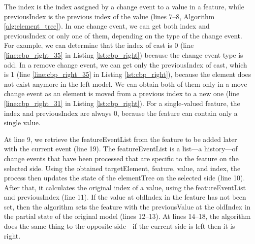 The \textsf{index} is the index assigned by a change event to a value in a feature, while \textsf{previousIndex} is the previous index of the value (lines 7–8, Algorithm \ref{alg:element_tree}). In one change event, we can get both \textsf{index} and \textsf{previousIndex} or only one of them, depending on the type of the change event. For example, we can determine that the \textsf{index} of \textsf{cast} is 0 (line \ref{line:cbp_right_35} in Listing \ref{lst:cbp_right}) because the change event type is \textsf{add}. In a \textsf{remove} change event, we can get only the \textsf{previousIndex} of \textsf{cast}, which is 1 (line \ref{line:cbp_right_35} in Listing \ref{lst:cbp_right}), because the element does not exist anymore in the left model. We can obtain both of them only in a \textsf{move} change event as an element is moved from a previous index to a new one (line \ref{line:cbp_right_31} in Listing \ref{lst:cbp_right}). For a single-valued feature, the \textsf{index} and \textsf{previousIndex} are always 0, because the feature can contain only a single value.

At line 9, we retrieve the \textsf{featureEventList} from the \textsf{feature} to be added later with the current \textsf{event} (line 19). The \textsf{featureEventList} is a list—a history—of change events that have been processed that are specific to the \textsf{feature} on the selected \textsf{side}. Using the obtained \textsf{targetElement}, \textsf{feature}, \textsf{value}, and \textsf{index}, the process then updates the state of the \textsf{elementTree} on the selected \textsf{side} (line 10). After that, it calculates the original index of a value, using the \textsf{featureEventList} and \textsf{previousIndex} (line 11). If the value at \textsf{oldIndex} in the \textsf{feature} has not been set, then the algorithm sets the \textsf{feature} with the \textsf{previousValue} at the \textsf{oldIndex} in the partial state of the original model (lines 12–13). At lines 14–18, the algorithm does the same thing to the opposite side—if the current \textsf{side} is \textsf{left} then it is \textsf{right}.

